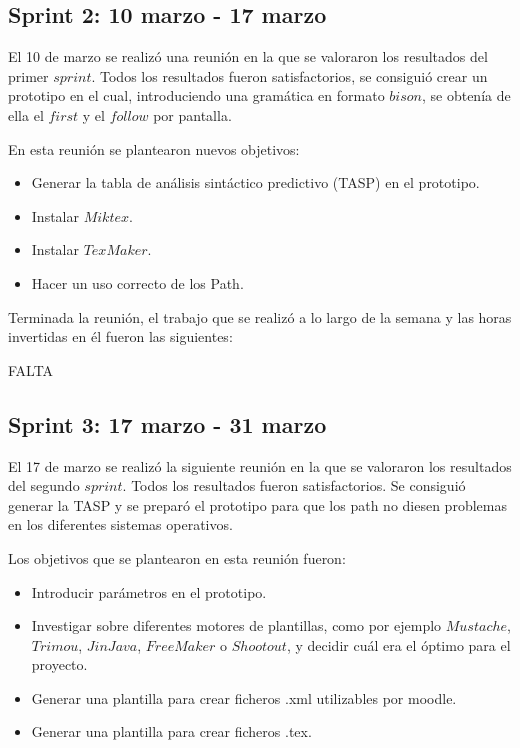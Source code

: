 \subsection{Sprint 2: 10 marzo - 17 marzo}

El 10 de marzo se realizó una reunión en la que se valoraron los resultados del primer $sprint$. Todos los resultados fueron satisfactorios, se consiguió crear un prototipo en el cual, introduciendo una gramática en formato $bison$, se obtenía de ella el $first$ y el $follow$ por pantalla.

En esta reunión se plantearon nuevos objetivos: 

\begin{itemize}
\item Generar la tabla de análisis sintáctico predictivo (TASP) en el prototipo.
\item Instalar $Miktex$.
\item Instalar $TexMaker$.
\item Hacer un uso correcto de los Path.
 
\end{itemize}

Terminada la reunión, el trabajo que se realizó a lo largo de la semana y las horas invertidas en él fueron las siguientes:

FALTA 

\subsection{Sprint 3: 17 marzo - 31 marzo}

El 17 de marzo se realizó la siguiente reunión en la que se valoraron los resultados del segundo $sprint$. Todos los resultados fueron satisfactorios. Se consiguió generar la TASP y se preparó el prototipo para que los path no diesen problemas en los diferentes sistemas operativos.
 
Los objetivos que se plantearon en esta reunión fueron:

\begin{itemize}
\item Introducir parámetros en el prototipo.
\item Investigar sobre diferentes motores de plantillas, como por ejemplo $Mustache$, $Trimou$, $JinJava$, $FreeMaker$ o $Shootout$, y decidir cuál era el óptimo para el proyecto.
\item Generar una plantilla para crear ficheros .xml utilizables por moodle.
\item Generar una plantilla para crear ficheros .tex. 
\end{itemize}


